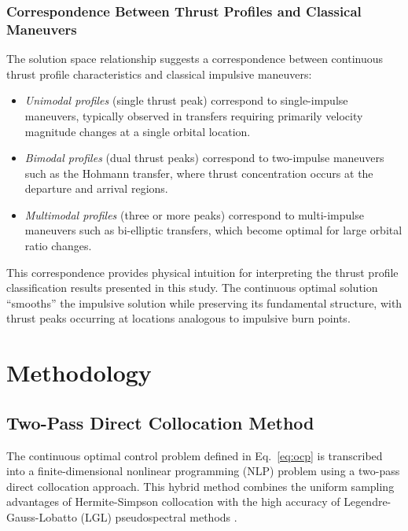 \documentclass[a4paper,fleqn]{cas-dc}
\let\origsubsection\subsection
\renewcommand{\subsection}{\FloatBarrier\origsubsection}
\begin{document}
\subsubsection{Correspondence Between Thrust Profiles and Classical Maneuvers}

The solution space relationship suggests a correspondence between continuous thrust profile characteristics and classical impulsive maneuvers:

\begin{itemize}
\item \textit{Unimodal profiles} (single thrust peak) correspond to single-impulse maneuvers, typically observed in transfers requiring primarily velocity magnitude changes at a single orbital location.

\item \textit{Bimodal profiles} (dual thrust peaks) correspond to two-impulse maneuvers such as the Hohmann transfer, where thrust concentration occurs at the departure and arrival regions.

\item \textit{Multimodal profiles} (three or more peaks) correspond to multi-impulse maneuvers such as bi-elliptic transfers, which become optimal for large orbital ratio changes.
\end{itemize}

This correspondence provides physical intuition for interpreting the thrust profile classification results presented in this study. The continuous optimal solution ``smooths'' the impulsive solution while preserving its fundamental structure, with thrust peaks occurring at locations analogous to impulsive burn points.


\section{Methodology}\label{sec:methodology}

\subsection{Two-Pass Direct Collocation Method}\label{subsec:direct_collocation}

The continuous optimal control problem defined in Eq.~\eqref{eq:ocp} is transcribed into a finite-dimensional nonlinear programming (NLP) problem using a two-pass direct collocation approach. This hybrid method combines the uniform sampling advantages of Hermite-Simpson collocation with the high accuracy of Legendre-Gauss-Lobatto (LGL) pseudospectral methods \citep{Hargraves1987,Rao2025,Fahroo2002}.
\end{document}
